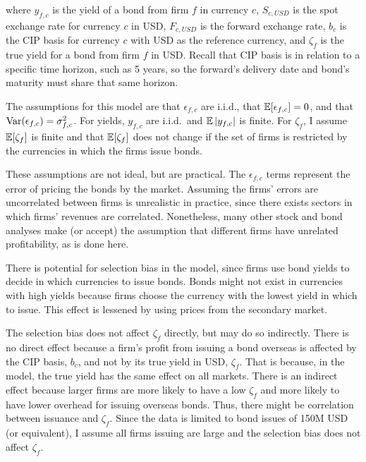 
\noindent where $y_{f,c}$ is the yield of a bond from firm $f$ in currency $c$, $S_{c,USD}$ is the spot exchange rate for currency $c$ in USD, $F_{c,USD}$ is the forward exchange rate, $b_{c}$ is the CIP basis for currency $c$ with USD as the reference currency, and $\zeta_{f}$ is the true yield for a bond from firm $f$ in USD.  Recall that CIP basis is in relation to a specific time horizon, such as 5 years, so the forward's delivery date and bond's maturity must share that same horizon.

The assumptions for this model are that $\epsilon_{f,c}$ are i.i.d., that $\operatorname{\mathbb{E}}[\epsilon_{f,c}] = 0$, and that $\operatorname{\mathrm{Var}}(\epsilon_{f,c}) = \sigma_{f,c}^2$.  For yields, $y_{f,c}$ are i.i.d.\ and $\operatorname{\mathbb{E}}|y_{f,c}|$ is finite.  For $\zeta_f$, I assume $\operatorname{\mathbb{E}}[\zeta_f]$ is finite and that $\operatorname{\mathbb{E}}[\zeta_f]$ does not change if the set of firms is restricted by the currencies in which the firms issue bonds.


These assumptions are not ideal, but are practical.  The $\epsilon_{f,c}$ terms represent the error of pricing the bonds by the market.  Assuming the firms' errors are uncorrelated between firms is unrealistic in practice, since there exists sectors in which firms' revenues are correlated.  Nonetheless, many other stock and bond analyses make (or accept) the assumption that different firms have unrelated profitability, as is done here.  

There is potential for selection bias in the model, since firms use bond yields to decide in which currencies to issue bonds.  Bonds might not exist in currencies with high yields because firms choose the currency with the lowest yield in which to issue.  This effect is lessened by using prices from the secondary market.  

The selection bias does not affect $\zeta_f$ directly, but may do so indirectly.  There is no direct effect because a firm's profit from issuing a bond overseas is affected by the CIP basis, $b_{c}$, and not by its true yield in USD, $\zeta_f$.  That is because, in the model, the true yield has the same effect on all markets.  There is an indirect effect because larger firms are more likely to have a low $\zeta_f$ and more likely to have lower overhead for issuing overseas bonds.  Thus, there might be correlation between issuance and $\zeta_f$.  Since the data is limited to bond issues of 150M USD (or equivalent), I assume all firms issuing are large and the selection bias does not affect $\zeta_f$.

